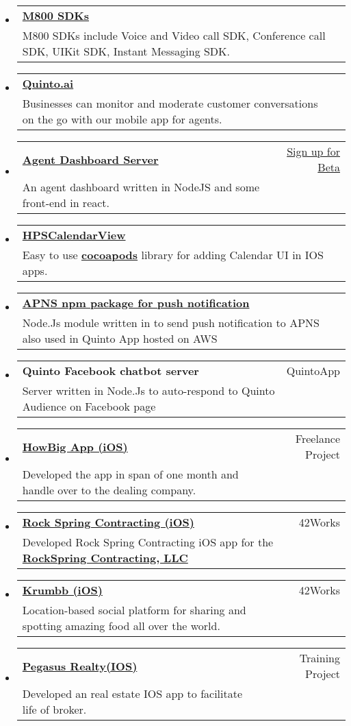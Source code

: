 \documentclass[letterpaper,11pt]{article}
\makeatletter
\newcommand{\ressubheading}[3]{
	\begin{tabular*}{6.5in}{l@{\extracolsep{\fill}}r}
			\textbf{#1} & #2\\
			{#3} \\
	\end{tabular*}\vspace{-6pt}
}
\makeatother
\begin{document}
	\begin{itemize}
	\item 
\ressubheading{\href{https://www.m800.com/sdk-solution}{M800 SDKs}}{}{M800 SDKs include Voice and Video call SDK, Conference call SDK, UIKit SDK, Instant Messaging SDK.}
    \item 
\ressubheading{\href{https://itunes.apple.com/in/app/quinto-ai/id1313674384}{Quinto.ai}}{}{Businesses can monitor and moderate customer conversations on the go with our mobile app for agents.}
\item 
			\ressubheading{\href{https://quinto.ai/}{Agent Dashboard Server}}{\href{https://quinto.ai/}{Sign up for Beta}}{An agent dashboard  written in NodeJS and some front-end in react.}
		\item 
			\ressubheading{\href{https://github.com/harry1064/HPSCalendarView}{HPSCalendarView}}{}{Easy to use \href{https://github.com/harry1064/HPSCalendarView}{\textbf{cocoapods}} library for adding Calendar UI in  IOS apps.}
		\item
			\ressubheading{\href{https://www.npmjs.com/package/apns-http2}{APNS npm package for push notification}}{}{Node.Js module written in  to send push notification to APNS also used in  Quinto App hosted on AWS}
		\item
			\ressubheading{Quinto Facebook chatbot server}{QuintoApp}{Server written in Node.Js to auto-respond to Quinto Audience on Facebook page}	
		\item
			\ressubheading{\href{https://itunes.apple.com/in/app/howbig-app/id982763195?mt=8}{HowBig App (iOS)}}{Freelance Project}{Developed the app in span of one month and handle over to the dealing company.}	
	   \item
			\ressubheading{\href{https://itunes.apple.com/in/app/rock-spring-contracting/id1026561788?mt=8}{Rock Spring Contracting (iOS)}}{42Works}{Developed Rock Spring Contracting iOS app for the {\href{http://www.rockspringcontracting.com/}{\textbf{RockSpring Contracting, LLC }}}}                                            \item
			\ressubheading{\href{https://itunes.apple.com/nz/app/krumbb/id1001546648?mt=8}{Krumbb (iOS)}}{42Works}{Location-based social platform for sharing and spotting amazing food all over the world.}	
		\item
			\ressubheading{\href{https://itunes.apple.com/us/app/pegasus-realty/id948309965?mt=8}{Pegasus Realty(IOS)}}{Training Project}{Developed an real estate IOS app to facilitate life of broker.}
\end{itemize}  %
\end{document}
